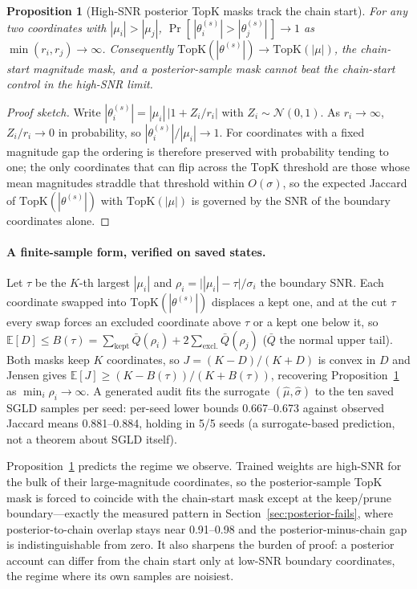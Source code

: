 \documentclass{article}
\newtheorem{proposition}{Proposition}
\begin{document}
\begin{proposition}[High-SNR posterior TopK masks track the chain start]
\label{prop:topk}
For any two coordinates with $|\mu_i| > |\mu_j|$,
$\Pr\!\left[\,|\theta^{(s)}_i| > |\theta^{(s)}_j|\,\right] \to 1$ as
$\min(r_i, r_j) \to \infty$. Consequently $\mathrm{TopK}(|\theta^{(s)}|) \to
\mathrm{TopK}(|\mu|)$, the chain-start magnitude mask, and a posterior-sample
mask cannot beat the chain-start control in the high-SNR limit.
\end{proposition}

\begin{proof}[Proof sketch]
Write $|\theta^{(s)}_i| = |\mu_i|\,\bigl|1 + Z_i/r_i\bigr|$ with $Z_i \sim
\mathcal{N}(0,1)$. As $r_i \to \infty$, $Z_i/r_i \to 0$ in probability, so
$|\theta^{(s)}_i|/|\mu_i| \to 1$. For coordinates with a fixed magnitude gap
the ordering is therefore preserved with probability tending to one; the only
coordinates that can flip across the $\mathrm{TopK}$ threshold are those whose
mean magnitudes straddle that threshold within $O(\sigma)$, so the expected
Jaccard of $\mathrm{TopK}(|\theta^{(s)}|)$ with $\mathrm{TopK}(|\mu|)$ is
governed by the SNR of the boundary coordinates alone.
\end{proof}

\paragraph{A finite-sample form, verified on saved states.}
Let $\tau$ be the $K$-th largest $|\mu_i|$ and $\rho_i = \bigl||\mu_i| -
\tau\bigr|/\sigma_i$ the boundary SNR. Each coordinate swapped into
$\mathrm{TopK}(|\theta^{(s)}|)$ displaces a kept one, and at the cut $\tau$
every swap forces an excluded coordinate above $\tau$ or a kept one below
it, so $\mathbb{E}[D] \le B(\tau) = \sum_{\mathrm{kept}} \bar{Q}(\rho_i) +
2\sum_{\mathrm{excl.}} \bar{Q}(\rho_j)$ ($\bar{Q}$ the normal upper tail).
Both masks keep $K$ coordinates, so $J = (K-D)/(K+D)$ is convex in $D$ and
Jensen gives $\mathbb{E}[J] \ge (K - B(\tau))/(K + B(\tau))$, recovering
Proposition~\ref{prop:topk} as $\min_i \rho_i \to \infty$. A generated
audit fits the surrogate $(\hat\mu, \hat\sigma)$ to the ten saved SGLD
samples per seed: per-seed lower bounds 0.667--0.673 against observed
Jaccard means 0.881--0.884, holding in 5/5 seeds (a surrogate-based
prediction, not a theorem about SGLD itself).

Proposition~\ref{prop:topk} predicts the regime we observe. Trained weights are
high-SNR for the bulk of their large-magnitude coordinates, so the
posterior-sample TopK mask is forced to coincide with the chain-start mask
except at the keep/prune boundary---exactly the measured pattern in
Section~\ref{sec:posterior-fails}, where posterior-to-chain overlap stays near
0.91--0.98 and the posterior-minus-chain gap is indistinguishable from zero. It
also sharpens the burden of proof: a posterior account can differ from the
chain start only at low-SNR boundary coordinates, the regime where its own
samples are noisiest.
\end{document}
